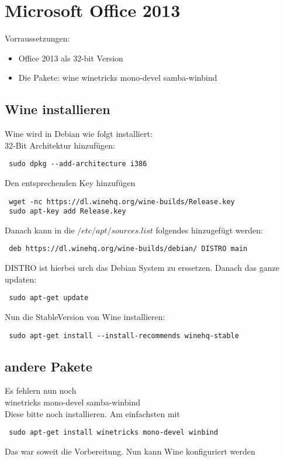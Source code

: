 \documentclass[11pt,fleqn]{book} %
\numberwithin{equation}{section} %
\numberwithin{figure}{section} %
\numberwithin{table}{section} %
\begin{document}
\chapter{Microsoft Office 2013}
Vorraussetzungen:\\
\begin{itemize}
 \item Office 2013 als 32-bit Version
 \item Die Pakete: wine winetricks mono-devel samba-winbind
\end{itemize}
\section{Wine installieren}
Wine wird in Debian wie folgt installiert:\\
32-Bit Architektur hinzufügen:
\begin{lstlisting}
 sudo dpkg --add-architecture i386
\end{lstlisting}
Den entsprechenden Key hinzufügen
\begin{lstlisting}
 wget -nc https://dl.winehq.org/wine-builds/Release.key 
 sudo apt-key add Release.key
\end{lstlisting}
Danach kann in die $/etc/apt/sources.list$ folgendes hinzugefügt werden:
\begin{lstlisting}
 deb https://dl.winehq.org/wine-builds/debian/ DISTRO main
\end{lstlisting}
DISTRO ist hierbei urch das Debian System zu erssetzen. Danach das ganze updaten:
\begin{lstlisting}
 sudo apt-get update
\end{lstlisting}
Nun die StableVersion von Wine installieren:
\begin{lstlisting}
 sudo apt-get install --install-recommends winehq-stable
\end{lstlisting}
\section{andere Pakete}
Es fehlern nun noch\\
winetricks mono-devel samba-winbind\\
Diese bitte noch installieren. Am einfachsten mit
\begin{lstlisting}
 sudo apt-get install winetricks mono-devel winbind
\end{lstlisting}
Das war soweit die Vorbereitung. Nun kann Wine konfiguriert werden
\end{document}
